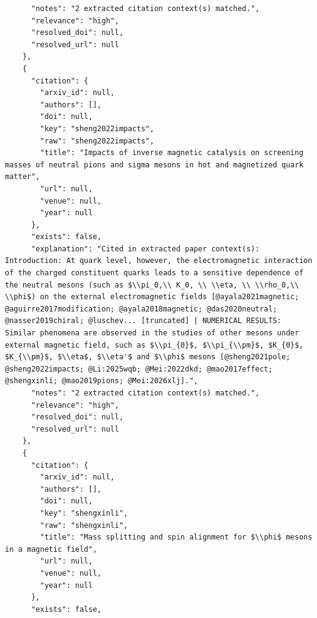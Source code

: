 \documentclass[11pt]{article}
\begin{document}
\begin{verbatim}
      "notes": "2 extracted citation context(s) matched.",
      "relevance": "high",
      "resolved_doi": null,
      "resolved_url": null
    },
    {
      "citation": {
        "arxiv_id": null,
        "authors": [],
        "doi": null,
        "key": "sheng2022impacts",
        "raw": "sheng2022impacts",
        "title": "Impacts of inverse magnetic catalysis on screening masses of neutral pions and sigma mesons in hot and magnetized quark matter",
        "url": null,
        "venue": null,
        "year": null
      },
      "exists": false,
      "explanation": "Cited in extracted paper context(s): Introduction: At quark level, however, the electromagnetic interaction of the charged constituent quarks leads to a sensitive dependence of the neutral mesons (such as $\\pi_0,\\ K_0, \\ \\eta, \\ \\rho_0,\\ \\phi$) on the external electromagnetic fields [@ayala2021magnetic; @aguirre2017modification; @ayala2018magnetic; @das2020neutral; @nasser2019chiral; @luschev... [truncated] | NUMERICAL RESULTS: Similar phenomena are observed in the studies of other mesons under external magnetic field, such as $\\pi_{0}$, $\\pi_{\\pm}$, $K_{0}$, $K_{\\pm}$, $\\eta$, $\\eta'$ and $\\phi$ mesons [@sheng2021pole; @sheng2022impacts; @Li:2025wqb; @Mei:2022dkd; @mao2017effect; @shengxinli; @mao2019pions; @Mei:2026xlj].",
      "notes": "2 extracted citation context(s) matched.",
      "relevance": "high",
      "resolved_doi": null,
      "resolved_url": null
    },
    {
      "citation": {
        "arxiv_id": null,
        "authors": [],
        "doi": null,
        "key": "shengxinli",
        "raw": "shengxinli",
        "title": "Mass splitting and spin alignment for $\\phi$ mesons in a magnetic field",
        "url": null,
        "venue": null,
        "year": null
      },
      "exists": false,

\end{verbatim}
\end{document}
